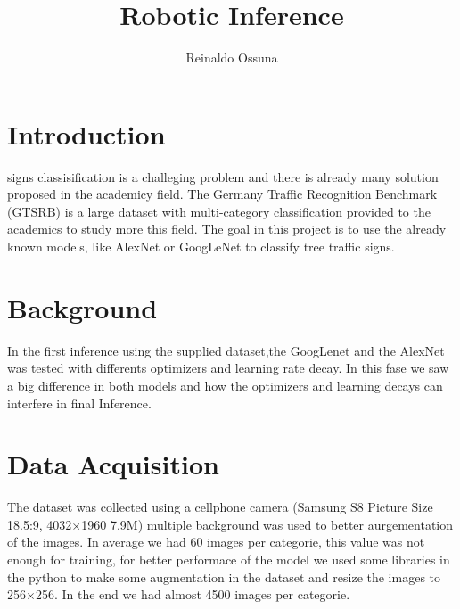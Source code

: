 \documentclass[10pt,journal,compsoc]{IEEEtran}
\begin{document}
\title{Robotic Inference}



\author{Reinaldo Ossuna}

%
{}


\maketitle
\IEEEdisplaynontitleabstractindextext
\IEEEpeerreviewmaketitle
\section{Introduction}
\label{sec:introduction}

 signs classisification is a challeging problem and there is already many solution proposed in the
academicy field\cite{Stallkamp2012}\cite{Lim2017}\cite{Ciresan2012}\cite{Escalera1997}. The Germany Traffic Recognition Benchmark (GTSRB)\cite{Houben-IJCNN-2013} is a large dataset with multi-category classification
provided to the academics to study more this field.
  The goal in this project is to use the already known models, like AlexNet or GoogLeNet to classify tree traffic signs.





\section{Background}

In the first inference using the supplied dataset,the GoogLenet\cite{Iino2014} and the AlexNet\cite{YannLeCun1998} was tested with
differents optimizers and learning rate decay. In this fase we saw a big difference in both models and how the
optimizers and learning decays can interfere in final Inference.


\section{Data Acquisition}
The dataset was collected using a cellphone camera (Samsung S8 Picture Size 18.5:9, 4032$\times$1960 7.9M) multiple background
was used to better aurgementation of the images. In average we had 60 images per categorie, this value was not enough for
training, for better performace of the model we used some libraries in the python to make some augmentation in the
dataset and resize the images to 256$\times$256. In the end we had almost 4500 images per categorie.
\end{document}
